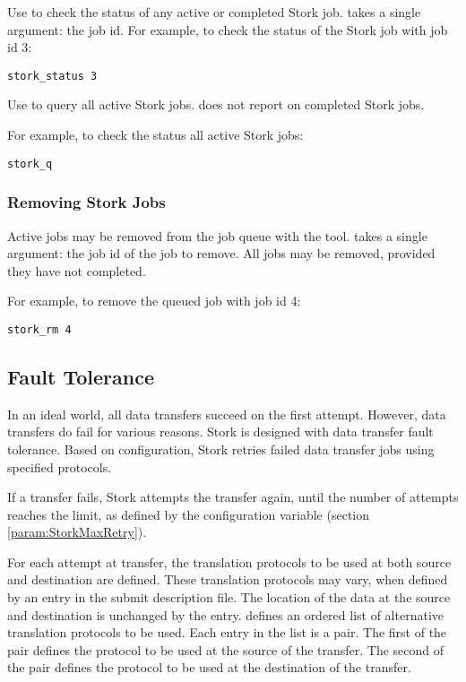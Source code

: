 Use  to check the status of any active
or completed Stork job.
 takes a single argument: the job id.
For example, to check the status of the Stork job with job id 3:

\begin{verbatim}
stork_status 3
\end{verbatim}

Use  to query all active Stork jobs.
 does not report on completed Stork jobs.

For example, to check the status all active Stork jobs:

\begin{verbatim}
stork_q
\end{verbatim}

\subsubsection{\label{sec:stork-rm}Removing Stork Jobs}

Active jobs may be removed from the job queue with the 
 tool.  
 takes a single argument: the job id of the job to remove.
All jobs may
be removed, provided they have not completed.

For example, to remove the queued job with job id 4:

\begin{verbatim}
stork_rm 4
\end{verbatim}

\subsection{\label{sec:Stork-Fault-Protection}Fault Tolerance}

In an ideal world, all data transfers succeed on the first attempt.
However, data transfers do fail for various reasons.
Stork is designed with data transfer fault tolerance.
Based on configuration, Stork retries failed data transfer jobs
using specified protocols.

If a  transfer fails, Stork attempts the transfer again,
until the number of attempts reaches the limit,
as defined by the 
configuration variable
(section \ref{param:StorkMaxRetry}).  

For each attempt at transfer,
the translation protocols to be used at both source and destination are defined.
These translation protocols may vary,
when defined by an  entry in the
submit description file.
The location of the data at the source and destination
is unchanged by the  entry.
 defines an ordered list of alternative
translation protocols to be used.
Each entry in the list is a pair.
The first of the pair defines the protocol to be used at the source 
of the transfer.
The second of the pair defines the protocol to be used at the destination 
of the transfer.

